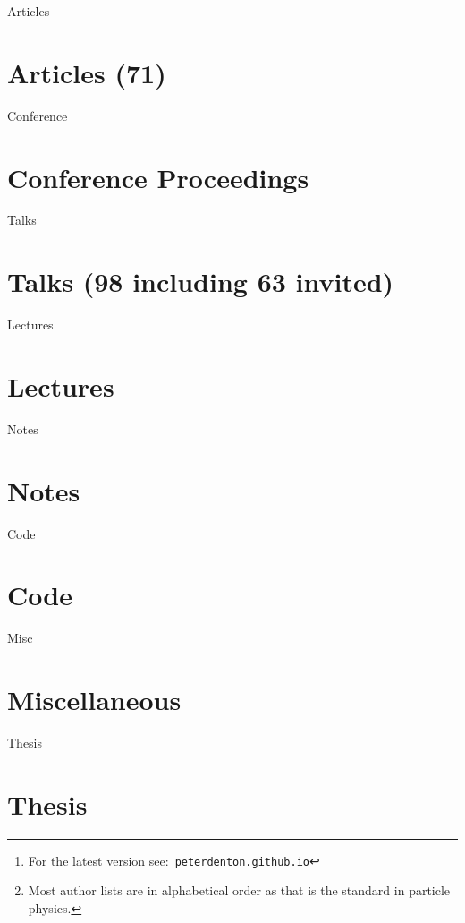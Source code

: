 \documentclass[12pt]{article}
\title{\myTitle}
\author{\myName}
\date{\small Updated: \today\footnote{For the latest version see:\ \href{http://peterdenton.github.io}{\tt peterdenton.github.io}} \footnote{Most author lists are in alphabetical order as that is the standard in particle physics.}}
\newcommand\myBib[2]{
\begin{btSect}{#2}
\section*{#1}
\btPrintAll
\end{btSect}}
\begin{document}

\maketitle



\myBib{Articles (71)}{Articles}
\myBib{Conference Proceedings}{Conference}
\myBib{Talks (98 including 63 invited)}{Talks}
\myBib{Lectures}{Lectures}
\myBib{Notes}{Notes}
\myBib{Code}{Code}
\myBib{Miscellaneous}{Misc}
\myBib{Thesis}{Thesis}
\end{document}

